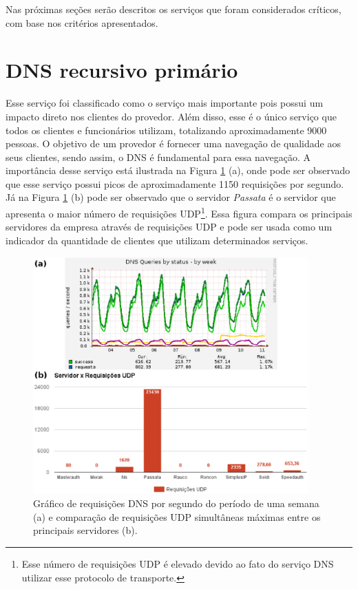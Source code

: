 Nas próximas seções serão descritos os serviços que foram considerados críticos, com base nos critérios apresentados.

\section{DNS recursivo primário}
\label{section:dnsrecprim}

Esse serviço foi classificado como o serviço mais importante pois possui um impacto direto nos clientes do provedor. Além disso, esse é o único 
serviço que todos os clientes e funcionários utilizam, totalizando aproximadamente 9000 pessoas. O objetivo de um provedor é fornecer uma navegação 
de qualidade aos seus clientes, sendo assim, o \ac{DNS} é fundamental para essa navegação. A importância desse serviço está ilustrada na Figura 
\ref{fig:dns_udp} (a), onde pode ser observado que esse serviço possui picos de aproximadamente 1150 requisições por segundo. Já na Figura 
\ref{fig:dns_udp} (b) pode ser observado que o servidor \textit{Passata} é o servidor que apresenta o maior número de requisições 
\ac{UDP}\footnote[1]{Esse número de requisições \ac{UDP} é elevado devido ao fato do serviço \ac{DNS} utilizar esse protocolo de transporte.}. 
Essa figura compara os principais servidores da empresa através de requisições \ac{UDP} e pode ser usada como um indicador da quantidade de 
clientes que utilizam determinados serviços.

\begin{figure}[h!]
 \centering
 \includegraphics[width=400px]{img/dns_udp.eps}
 \caption{Gráfico de requisições DNS por segundo do período de uma semana (a) e comparação de requisições UDP simultâneas máximas entre 
 os principais servidores (b).}
 \label{fig:dns_udp}
\end{figure}

